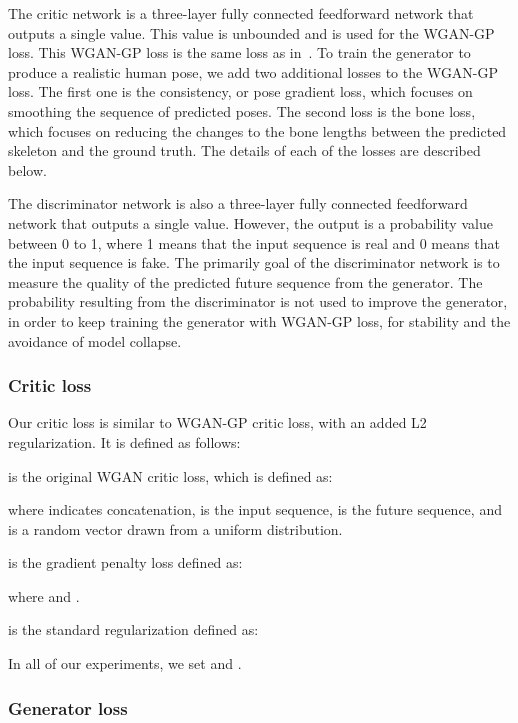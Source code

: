 \documentclass[10pt,twocolumn,letterpaper]{article}
\begin{document}
The critic network is a three-layer fully connected feedforward network that outputs a single value. This value is unbounded and is used for the WGAN-GP loss. This WGAN-GP loss is the same loss as in~\cite{corr2017:Ishaan}. To train the generator to produce a realistic human pose, we add two additional losses to the WGAN-GP loss. The first one is the consistency, or pose gradient loss, which focuses on smoothing the sequence of predicted poses. The second loss is the bone loss, which focuses on reducing the changes to the bone lengths between the predicted skeleton and the ground truth.  The details of each of the losses are described below.

The discriminator network is also a three-layer fully connected feedforward network that outputs a single value. However, the output is a probability value between 0 to 1, where 1 means that the input sequence is real and 0 means that the input sequence is fake. The primarily goal of the discriminator network is to measure the quality of the predicted future sequence from the generator. The probability resulting from the discriminator is not used to improve the generator, in order to keep training the generator with WGAN-GP loss, for stability and the avoidance of model collapse. 



\subsubsection{Critic loss}

Our critic loss is similar to WGAN-GP critic loss, with an added L2 regularization. It is defined as follows:



 is the original WGAN critic loss, which is defined as:


where  indicates concatenation,  is the input sequence,  is the future sequence, and  is a random vector drawn from a uniform distribution. 

 is the gradient penalty loss defined as:


where  and .

 is the standard  regularization defined as:



In all of our experiments, we set  and .

\subsubsection{Generator loss}
\end{document}
